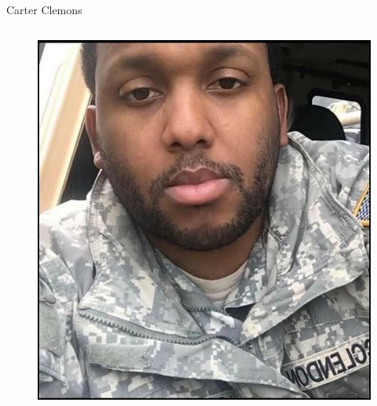 \documentclass[nobackground,dvipsnames,table]{beamer}
\begin{document}
\begin{frame}{Carter Clemons}
\begin{columns}
\begin{figure}
                \includegraphics[height=0.5\textheight]{carter-clemons-photo}
            \end{figure}
    \end{columns}
\end{frame}
\end{document}
